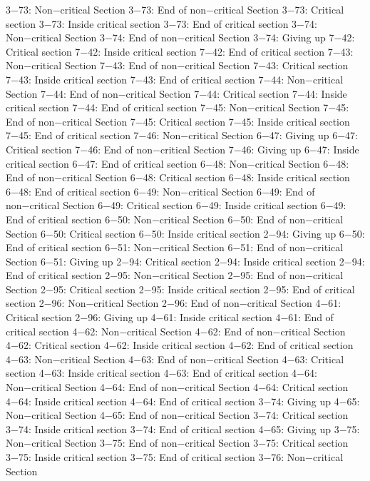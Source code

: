 3−73: Non−critical Section
3−73: End of non−critical Section
3−73: Critical section
3−73: Inside critical section
3−73: End of critical section
3−74: Non−critical Section
3−74: End of non−critical Section
3−74: Giving up
7−42: Critical section
7−42: Inside critical section
7−42: End of critical section
7−43: Non−critical Section
7−43: End of non−critical Section
7−43: Critical section
7−43: Inside critical section
7−43: End of critical section
7−44: Non−critical Section
7−44: End of non−critical Section
7−44: Critical section
7−44: Inside critical section
7−44: End of critical section
7−45: Non−critical Section
7−45: End of non−critical Section
7−45: Critical section
7−45: Inside critical section
7−45: End of critical section
7−46: Non−critical Section
6−47: Giving up
6−47: Critical section
7−46: End of non−critical Section
7−46: Giving up
6−47: Inside critical section
6−47: End of critical section
6−48: Non−critical Section
6−48: End of non−critical Section
6−48: Critical section
6−48: Inside critical section
6−48: End of critical section
6−49: Non−critical Section
6−49: End of non−critical Section
6−49: Critical section
6−49: Inside critical section
6−49: End of critical section
6−50: Non−critical Section
6−50: End of non−critical Section
6−50: Critical section
6−50: Inside critical section
2−94: Giving up
6−50: End of critical section
6−51: Non−critical Section
6−51: End of non−critical Section
6−51: Giving up
2−94: Critical section
2−94: Inside critical section
2−94: End of critical section
2−95: Non−critical Section
2−95: End of non−critical Section
2−95: Critical section
2−95: Inside critical section
2−95: End of critical section
2−96: Non−critical Section
2−96: End of non−critical Section
4−61: Critical section
2−96: Giving up
4−61: Inside critical section
4−61: End of critical section
4−62: Non−critical Section
4−62: End of non−critical Section
4−62: Critical section
4−62: Inside critical section
4−62: End of critical section
4−63: Non−critical Section
4−63: End of non−critical Section
4−63: Critical section
4−63: Inside critical section
4−63: End of critical section
4−64: Non−critical Section
4−64: End of non−critical Section
4−64: Critical section
4−64: Inside critical section
4−64: End of critical section
3−74: Giving up
4−65: Non−critical Section
4−65: End of non−critical Section
3−74: Critical section
3−74: Inside critical section
3−74: End of critical section
4−65: Giving up
3−75: Non−critical Section
3−75: End of non−critical Section
3−75: Critical section
3−75: Inside critical section
3−75: End of critical section
3−76: Non−critical Section
